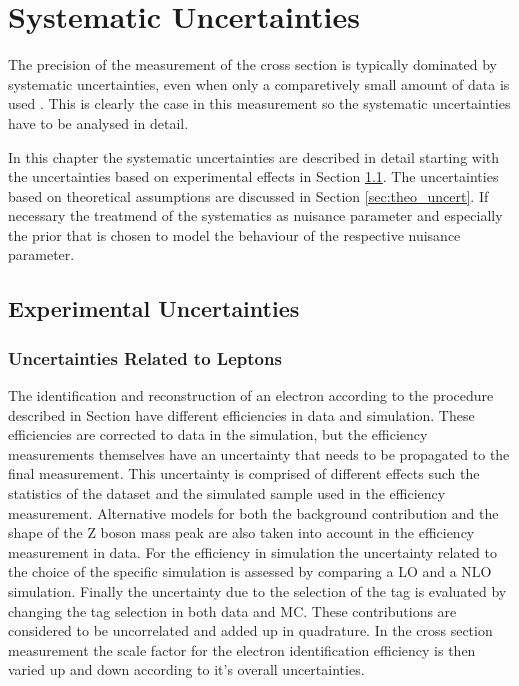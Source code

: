
\chapter{Systematic Uncertainties}
\label{sec:syst_uncert}

The precision of the measurement of the \ttbar cross section is typically dominated by systematic uncertainties,
even when only a comparetively small amount of data is used . This is clearly the case in this
measurement so the systematic uncertainties have to be analysed in detail.

In this chapter the systematic uncertainties are described in detail starting with the uncertainties based on experimental effects in Section \ref{sec:exp_uncert}.
The uncertainties based on theoretical assumptions are discussed in Section \ref{sec:theo_uncert}. If necessary the treatmend of the systematics as nuisance
parameter and especially the prior that is chosen to model the behaviour of the respective nuisance parameter.


\section{Experimental Uncertainties}
\label{sec:exp_uncert}

\subsection{Uncertainties Related to Leptons}

The identification and reconstruction of an electron according to the procedure described in Section  have different efficiencies in data and simulation.
These efficiencies are corrected to data in the simulation, but the efficiency measurements themselves have an uncertainty that needs to be propagated to the final measurement.
This uncertainty is comprised of different effects such the statistics of the dataset and the simulated sample used in the efficiency measurement. Alternative models for both the background contribution
and the shape of the Z boson mass peak are also taken into account in the efficiency measurement in data. For the efficiency in simulation the uncertainty related to the choice of the specific simulation is assessed by comparing a LO and a NLO simulation.
Finally the uncertainty due to the selection of the tag is evaluated by changing the tag selection in both data and MC.
These contributions are considered to be uncorrelated and added up in quadrature. 
In the cross section measurement the scale factor for the electron identification efficiency is then varied up and down according to it's overall uncertainties.

